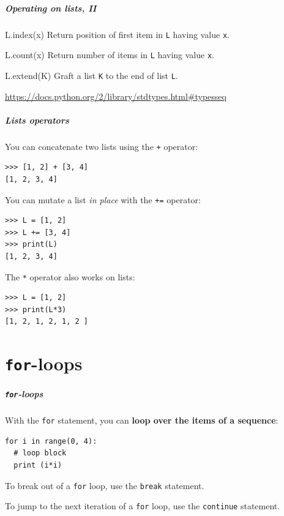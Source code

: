 \documentclass[english,serif,mathserif,xcolor=pdftex,dvipsnames,table]{beamer}
\begin{document}
\begin{frame}[fragile]
  \frametitle{Operating on lists, II}

  \begin{describe}{L.index(x)}
    Return position of first item in \texttt{L} having value \texttt{x}.
  \end{describe}

  \begin{describe}{L.count(x)}
    Return number of items in \texttt{L} having value \texttt{x}.
  \end{describe}

  \begin{describe}{L.extend(K)}
    Graft a list \texttt{K} to the end of list \texttt{L}.
  \end{describe}

  \begin{references}
    \url{https://docs.python.org/2/library/stdtypes.html#typesseq}
  \end{references}
\end{frame}


\begin{frame}[fragile]
  \frametitle{Lists operators}
  You can concatenate two lists using the \texttt{+} operator:
  \begin{lstlisting}
>>> [1, 2] + [3, 4]
[1, 2, 3, 4]
  \end{lstlisting}

  \+
  You can mutate a list \emph{in place} with the \texttt{+=} operator:
  \begin{lstlisting}
>>> L = [1, 2]
>>> L += [3, 4]
>>> print(L)
[1, 2, 3, 4]
  \end{lstlisting}

\+
The \texttt{*} operator also works on lists:
  \begin{lstlisting}
>>> L = [1, 2]
>>> print(L*3)
[1, 2, 1, 2, 1, 2 ]
  \end{lstlisting}
\end{frame}


\part{\texttt{for}-loops}
\begin{frame}[fragile]
  \frametitle{\texttt{for}-loops}
    With the  \texttt{for} statement, you can \textbf{loop over the items of
    a sequence}:
\begin{lstlisting}
for i in range(0, 4):
  # loop block
  print (i*i)
\end{lstlisting}

  \+
  To break out of a \texttt{for} loop, use the \texttt{break}
  statement.

  \+
  To jump to the next iteration of a \texttt{for} loop, use the
  \texttt{continue} statement.
\end{frame}
\end{document}
